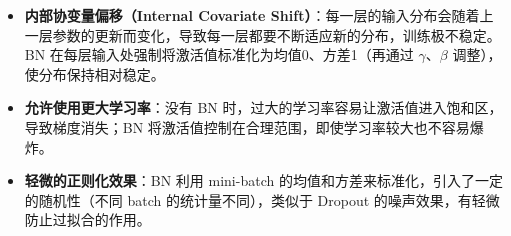 \documentclass[a4paper,11pt]{ctexart}
\begin{document}
\begin{beginnerbox}
    \begin{itemize}
        \item \textbf{内部协变量偏移（Internal Covariate Shift）}：每一层的输入分布会随着上一层参数的更新而变化，导致每一层都要不断适应新的分布，训练极不稳定。BN 在每层输入处强制将激活值标准化为均值0、方差1（再通过 $\gamma$、$\beta$ 调整），使分布保持相对稳定。
        \item \textbf{允许使用更大学习率}：没有 BN 时，过大的学习率容易让激活值进入饱和区，导致梯度消失；BN 将激活值控制在合理范围，即使学习率较大也不容易爆炸。
        \item \textbf{轻微的正则化效果}：BN 利用 mini-batch 的均值和方差来标准化，引入了一定的随机性（不同 batch 的统计量不同），类似于 Dropout 的噪声效果，有轻微防止过拟合的作用。
    \end{itemize}
\end{beginnerbox}
\end{document}
